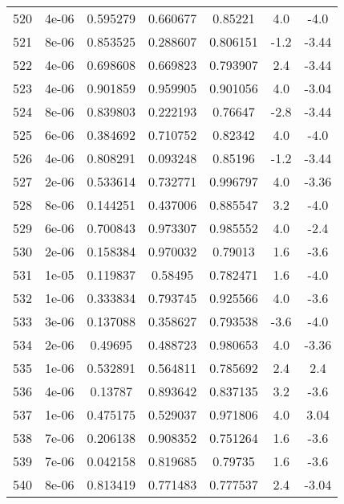 \begin{table}
\begin{tabular}{c|c|c|c|c|c|c}
520 & 4e-06 & 0.595279 & 0.660677 & 0.85221 & 4.0 & -4.0\\
521 & 8e-06 & 0.853525 & 0.288607 & 0.806151 & -1.2 & -3.44\\
522 & 4e-06 & 0.698608 & 0.669823 & 0.793907 & 2.4 & -3.44\\
523 & 4e-06 & 0.901859 & 0.959905 & 0.901056 & 4.0 & -3.04\\
524 & 8e-06 & 0.839803 & 0.222193 & 0.76647 & -2.8 & -3.44\\
525 & 6e-06 & 0.384692 & 0.710752 & 0.82342 & 4.0 & -4.0\\
526 & 4e-06 & 0.808291 & 0.093248 & 0.85196 & -1.2 & -3.44\\
527 & 2e-06 & 0.533614 & 0.732771 & 0.996797 & 4.0 & -3.36\\
528 & 8e-06 & 0.144251 & 0.437006 & 0.885547 & 3.2 & -4.0\\
529 & 6e-06 & 0.700843 & 0.973307 & 0.985552 & 4.0 & -2.4\\
530 & 2e-06 & 0.158384 & 0.970032 & 0.79013 & 1.6 & -3.6\\
531 & 1e-05 & 0.119837 & 0.58495 & 0.782471 & 1.6 & -4.0\\
532 & 1e-06 & 0.333834 & 0.793745 & 0.925566 & 4.0 & -3.6\\
533 & 3e-06 & 0.137088 & 0.358627 & 0.793538 & -3.6 & -4.0\\
534 & 2e-06 & 0.49695 & 0.488723 & 0.980653 & 4.0 & -3.36\\
535 & 1e-06 & 0.532891 & 0.564811 & 0.785692 & 2.4 & 2.4\\
536 & 4e-06 & 0.13787 & 0.893642 & 0.837135 & 3.2 & -3.6\\
537 & 1e-06 & 0.475175 & 0.529037 & 0.971806 & 4.0 & 3.04\\
538 & 7e-06 & 0.206138 & 0.908352 & 0.751264 & 1.6 & -3.6\\
539 & 7e-06 & 0.042158 & 0.819685 & 0.79735 & 1.6 & -3.6\\
540 & 8e-06 & 0.813419 & 0.771483 & 0.777537 & 2.4 & -3.04\\
\end{tabular}
\end{table}
\newpage
